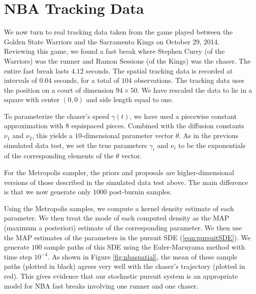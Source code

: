 \documentclass[graybox]{svmult}
\begin{document}
\section{NBA Tracking Data}
We now turn to real tracking data taken from the game played between
the Golden State Warriors and the Sacramento Kings on October 29,
2014.  Reviewing this game, we found a fast break where Stephen Curry
(of the Warriors) was the runner and Ramon Sessions (of the Kings) was
the chaser.  The entire fast break lasts $4.12$ seconds.  The spatial
tracking data is recorded at intervals of $0.04$ seconds, for a total
of $104$ observations.  The tracking data uses the position on a court
of dimension $94 \times 50$.  We have rescaled the data to lie in a
square with center $(0,0)$ and side length equal to one.

To parameterize the chaser's speed $\gamma(t)$, we have used a
piecewise constant approximation with $8$ equispaced pieces.  Combined
with the diffusion constants $\nu_1$ and $\nu_2$, this yields a
$10$-dimensional parameter vector $\theta$.  As in the previous
simulated data test, we set the true parameters $\gamma_i$ and $\nu_i$ to
be the exponentials of the corresponding elements of the $\theta$
vector.

For the Metropolis sampler, the priors and proposals are
higher-dimensional versions of those described in the simulated data
test above.  The main difference is that we now generate only $1000$
post-burnin samples. 

Using the Metropolis samples, we compute a kernel density estimate of
each parameter.  We then treat the mode of each computed density as
the MAP (maximum a posteriori) estimate of the corresponding
parameter.  We then use the MAP estimates of the parameters in the
pursuit SDE (\ref{eqn:pursuitSDE}).  We generate $100$ sample paths of
this SDE using the Euler-Maruyama method with time step $10^{-4}$.  As
shown in Figure \ref{fig:nbaspatial}, the mean of these sample paths
(plotted in black) agrees very well with the chaser's trajectory
(plotted in red).  This gives evidence that our stochastic pursuit
system is an appropriate model for NBA fast breaks involving one
runner and one chaser.
\end{document}
